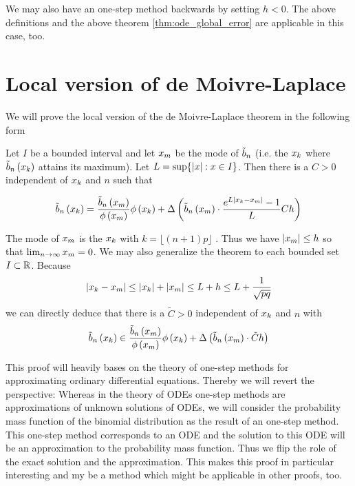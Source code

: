 We may also have an one-step method backwards by setting $h < 0$. The above definitions and the  above theorem \ref{thm:ode_global_error} are applicable in this case, too.

\section{Local version of de Moivre-Laplace}

We will prove the local version of the de Moivre-Laplace theorem in the following form

\newcommand*{\bnp}{\bb{\xnp}}
\newcommand*{\knp}{m}
\newcommand*{\xnp}{\x[\knp]}
\newcommand*{\phin}[2][n]{y_{#1}\left({#2}\right)}
\newcommand*{\dphin}[2][n]{y_{#1}'\left({#2}\right)}

\begin{theorem}
  Let $I$ be a bounded interval and let $\xnp$ be the mode of $\bbs$ (i.e. the $\x$ where $\bb{\x}$ attains its maximum). Let $L = \sup\{\abs{x}: x \in I\}$. Then there is a $C > 0$ independent of $\x$ and $n$ such that

  \begin{align}
    \bb{\x} = \frac{\bnp}{\fphi{\xnp}}\fphi{\x} + \bigabs{{\bnp}\cdot \frac{\fe{L\abs{\x-\xnp}}-1}L Ch}
  \end{align}
\end{theorem}

\begin{remark} \label{remark:alt_local}
  The mode of $\xnp$ is the $\x[k]$ with $k = \lfloor (n+1)p \rfloor$ \cite{nicolas}\cite{wiki:binomial_distribution}. Thus we have $\abs{\xnp} \le h$ so that $\lim_{n\to\infty} \xnp = 0$. We may also generalize the theorem to each bounded set $I \subset \R$.  Because
  \begin{align}
    \abs{\x[k]-\xnp} \le \abs{\x[k]}+\abs{\xnp} \le L + h \le L + \frac{1}{\sqrt{pq}}
  \end{align}
  we can directly deduce that there is a $\tilde C > 0$ independent of $\x$ and $n$ with
  \begin{align}
    \bb{\x} \in \frac{\bnp}{\fphi{\xnp}}\fphi{\x} + \bigabs{{\bnp}\cdot \tilde Ch}
  \end{align}
\end{remark}

This proof will heavily bases on the theory of one-step methods for approximating ordinary differential equations. Thereby we will revert the perspective: Whereas in the theory of ODEs one-step methods are approximations of unknown solutions of ODEs, we will consider the probability mass function of the binomial distribution as the result of an one-step method. This one-step method corresponds to an ODE and the solution to this ODE will be an approximation to the probability mass function. Thus we flip the role of the exact solution and the approximation. This makes this proof in particular interesting and my be a method which might be applicable in other proofs, too.

